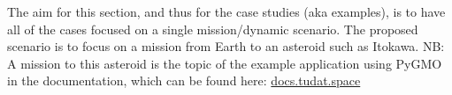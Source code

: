 
The aim for this section, and thus for the case studies (aka examples), is to have all of the cases focused on a single mission/dynamic scenario. The proposed scenario is to focus on a mission from Earth to an asteroid such as Itokawa. NB: A mission to this asteroid is the topic of the example application using PyGMO in the documentation, which can be found here: 
\href{https://docs.tudat.space/en/latest/_src_getting_started/_src_examples/notebooks/pygmo/asteroid_orbit_optimization.html#}{docs.tudat.space}


